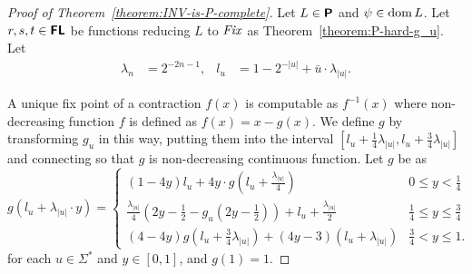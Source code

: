 \documentclass[envcountsame,orivec,oribibl]{llncs}
\begin{document}
\begin{proof}
[Proof of Theorem~\ref{theorem:INV-is-P-complete}]
Let $L \in \text{\bfseries \sffamily \upshape P}$ and $\psi \in \mathop{\rm dom} L$.
Let $r, s, t \in \text{\bfseries \sffamily \upshape FL}$ be functions reducing $L$ to $\mathit{Fix}$
as Theorem~\ref{theorem:P-hard-g_u}.
Let
\begin{align}
 \lambda_n &= 2^{-2n-1},
 &
 l_u & = 1 - 2^{-|u|} + \bar u \cdot \lambda_{|u|}.
\end{align}

A unique fix point of a contraction $f(x)$ is computable as
$f^{-1}(x)$ where non-decreasing function $f$ is defined as $f(x) = x - g(x)$.
We define $g$ by transforming $g_u$ in this way, putting them into the
interval $[l_u + \frac{1}{4}\lambda_{|u|}, l_u + \frac{3}{4}\lambda_{|u|}]$
and connecting so that $g$ is non-decreasing continuous function.
Let $g$ be as
\begin{equation}
\label{equation: definition of g}
 g \left( l_u + \lambda_{|u|} \cdot y \right) =
 \begin{cases}
  (1-4y)l_u + 4y \cdot g \left( l_u + \frac{\lambda_{|u|}}{4} \right) 
  &
  0 \le y < \frac 1 4
  \\
  \frac{\lambda_{|u|}}{4} \left( 2y - \frac 1 2 - g_u \left( 2y - \frac 1 2 \right) \right) + l_u + \frac{\lambda_{|u|}}{2}
  &
  \frac 1 4 \le y \le \frac 3 4
  \\
  (4-4y) g \left( l_u + \frac 3 4 \lambda_{|u|} \right) + (4y-3)(l_u + \lambda_{|u|})
  &
  \frac 3 4 < y \le 1.
 \end{cases}
\end{equation}
for each $u \in \Sigma^*$ and $y \in [0,1]$, and $g(1) = 1$.


\end{proof}
\end{document}
